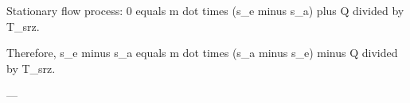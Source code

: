 Stationary flow process:  
0 equals m dot times (s_e minus s_a) plus Q divided by T_srz.  

Therefore, s_e minus s_a equals m dot times (s_a minus s_e) minus Q divided by T_srz.  

---